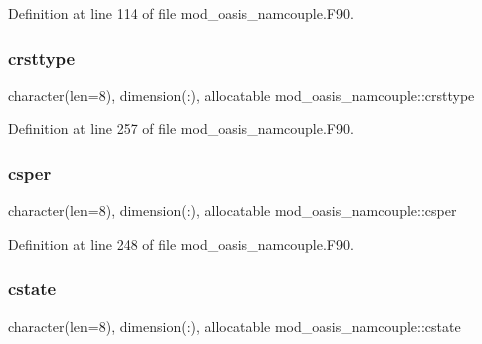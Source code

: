 Definition at line 114 of file mod\+\_\+oasis\+\_\+namcouple.\+F90.

\mbox{\label{namespacemod__oasis__namcouple_a7cbf27327f01748c4f87803ccff71b61}} 
\subsubsection{\texorpdfstring{crsttype}{crsttype}}
{\footnotesize\ttfamily character(len=8), dimension(\+:), allocatable mod\+\_\+oasis\+\_\+namcouple\+::crsttype\hspace{0.3cm}{\ttfamily [private]}}



Definition at line 257 of file mod\+\_\+oasis\+\_\+namcouple.\+F90.

\mbox{\label{namespacemod__oasis__namcouple_a348612422a03e478041ca5bdfd7201ae}} 
\subsubsection{\texorpdfstring{csper}{csper}}
{\footnotesize\ttfamily character(len=8), dimension(\+:), allocatable mod\+\_\+oasis\+\_\+namcouple\+::csper\hspace{0.3cm}{\ttfamily [private]}}



Definition at line 248 of file mod\+\_\+oasis\+\_\+namcouple.\+F90.

\mbox{\label{namespacemod__oasis__namcouple_a4b507ab44ad62713c9e3d83ded6be3f4}} 
\subsubsection{\texorpdfstring{cstate}{cstate}}
{\footnotesize\ttfamily character(len=8), dimension(\+:), allocatable mod\+\_\+oasis\+\_\+namcouple\+::cstate\hspace{0.3cm}{\ttfamily [private]}}



